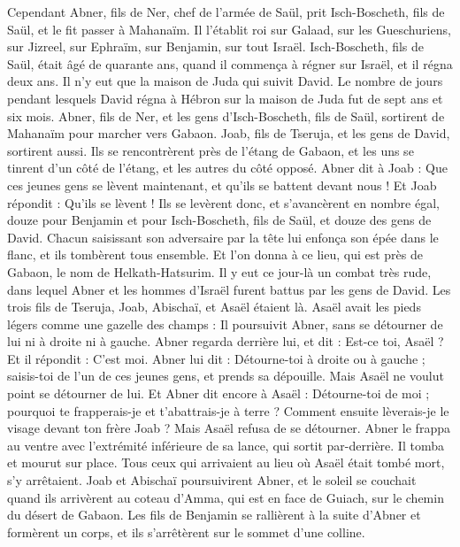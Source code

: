 \begin{multicols}{2}
Cependant Abner, fils de Ner, chef de l'armée de Saül, prit Isch-Boscheth, fils de Saül, et le fit passer à Mahanaïm.
Il l'établit roi sur Galaad, sur les Gueschuriens, sur Jizreel, sur Ephraïm, sur Benjamin, sur tout Israël.
Isch-Boscheth, fils de Saül, était âgé de quarante ans, quand il commença à régner sur Israël, et il régna deux ans. Il n'y eut que la maison de Juda qui suivit David.
Le nombre de jours pendant lesquels David régna à Hébron sur la maison de Juda fut de sept ans et six mois.
Abner, fils de Ner, et les gens d'Isch-Boscheth, fils de Saül, sortirent de Mahanaïm pour marcher vers Gabaon.
Joab, fils de Tseruja, et les gens de David, sortirent aussi. Ils se rencontrèrent près de l'étang de Gabaon, et les uns se tinrent d’un côté de l'étang, et les autres du côté opposé.
Abner dit à Joab : Que ces jeunes gens se lèvent maintenant, et qu'ils se battent devant nous ! Et Joab répondit : Qu'ils se lèvent !
Ils se levèrent donc, et s’avancèrent en nombre égal, douze pour Benjamin et pour Isch-Boscheth, fils de Saül, et douze des gens de David.
Chacun saisissant son adversaire par la tête lui enfonça son épée dans le flanc, et ils tombèrent tous ensemble. Et l'on donna à ce lieu, qui est près de Gabaon, le nom de Helkath-Hatsurim.
Il y eut ce jour-là un combat très rude, dans lequel Abner et les hommes d’Israël furent battus par les gens de David.
Les trois fils de Tseruja, Joab, Abischaï, et Asaël étaient là. Asaël avait les pieds légers comme une gazelle des champs :
Il poursuivit Abner, sans se détourner de lui ni à droite ni à gauche.
Abner regarda derrière lui, et dit : Est-ce toi, Asaël ? Et il répondit : C’est moi.
Abner lui dit : Détourne-toi à droite ou à gauche ; saisis-toi de l'un de ces jeunes gens, et prends sa dépouille. Mais Asaël ne voulut point se détourner de lui.
Et Abner dit encore à Asaël : Détourne-toi de moi ; pourquoi te frapperais-je et t'abattrais-je à terre ? Comment ensuite lèverais-je le visage devant ton frère Joab ?
Mais Asaël refusa de se détourner. Abner le frappa au ventre avec l'extrémité inférieure de sa lance, qui sortit par-derrière. Il tomba et mourut sur place. Tous ceux qui arrivaient au lieu où Asaël était tombé mort, s'y arrêtaient.
Joab et Abischaï poursuivirent Abner, et le soleil se couchait quand ils arrivèrent au coteau d'Amma, qui est en face de Guiach, sur le chemin du désert de Gabaon.
Les fils de Benjamin se rallièrent à la suite d'Abner et formèrent un corps, et ils s’arrêtèrent sur le sommet d'une colline.

\end{multicols}
